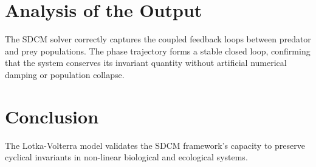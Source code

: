 \section{Analysis of the Output}
The SDCM solver correctly captures the coupled feedback loops between predator and prey populations. The phase trajectory forms a stable closed loop, confirming that the system conserves its invariant quantity without artificial numerical damping or population collapse.

\section{Conclusion}
The Lotka-Volterra model validates the SDCM framework's capacity to preserve cyclical invariants in non-linear biological and ecological systems.